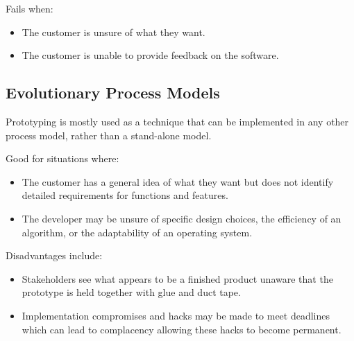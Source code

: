 \documentclass[12pt letter]{report}
\begin{document}
Fails when:
\begin{itemize}
  \item The customer is unsure of what they want.
  \item  The customer is unable to provide feedback on the software.
\end{itemize}

\subsection{Evolutionary Process Models}



Prototyping is mostly used as a technique that can be implemented in any other process model, rather than a stand-alone model.

Good for situations where:
\begin{itemize}
  \item The customer has a general idea of what they want but does not identify detailed requirements for functions and features.
  \item The developer may be unsure of specific design choices, the efficiency of an algorithm, or the adaptability of an operating system.
\end{itemize}

Disadvantages include:
\begin{itemize}
  \item Stakeholders see what appears to be a finished product unaware that the prototype is held together with glue and duct tape.
  \item Implementation compromises and hacks may be made to meet deadlines which can lead to complacency allowing these hacks to become permanent.
\end{itemize}
\end{document}
